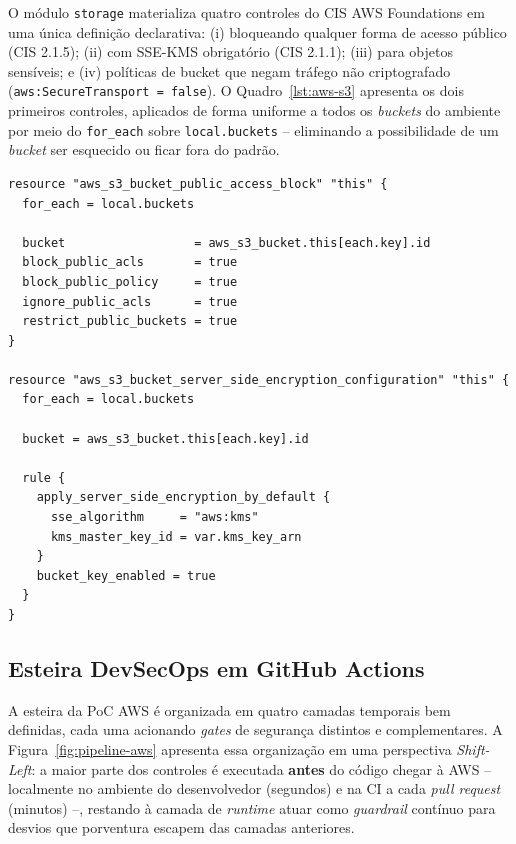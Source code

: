 O módulo \texttt{storage} materializa quatro controles do CIS AWS Foundations em uma única definição declarativa: (i)  bloqueando qualquer forma de acesso público (CIS 2.1.5); (ii)  com SSE-KMS obrigatório (CIS 2.1.1); (iii)  para objetos sensíveis; e (iv) políticas de bucket que negam tráfego não criptografado (\texttt{aws:SecureTransport = false}). O Quadro~\ref{lst:aws-s3} apresenta os dois primeiros controles, aplicados de forma uniforme a todos os \textit{buckets} do ambiente por meio do \texttt{for\_each} sobre \texttt{local.buckets} -- eliminando a possibilidade de um \textit{bucket} ser esquecido ou ficar fora do padrão.

\begin{lstlisting}[language=HCL,caption={Configuração declarativa de segurança para buckets S3 (\texttt{terraform/modules/storage/main.tf}).},label={lst:aws-s3}]
resource "aws_s3_bucket_public_access_block" "this" {
  for_each = local.buckets

  bucket                  = aws_s3_bucket.this[each.key].id
  block_public_acls       = true
  block_public_policy     = true
  ignore_public_acls      = true
  restrict_public_buckets = true
}

resource "aws_s3_bucket_server_side_encryption_configuration" "this" {
  for_each = local.buckets

  bucket = aws_s3_bucket.this[each.key].id

  rule {
    apply_server_side_encryption_by_default {
      sse_algorithm     = "aws:kms"
      kms_master_key_id = var.kms_key_arn
    }
    bucket_key_enabled = true
  }
}
\end{lstlisting}

\subsection{Esteira DevSecOps em GitHub Actions}
\label{sec:pipeline-aws}

A esteira da PoC AWS é organizada em quatro camadas temporais bem definidas, cada uma acionando \textit{gates} de segurança distintos e complementares. A Figura~\ref{fig:pipeline-aws} apresenta essa organização em uma perspectiva \textit{Shift-Left}: a maior parte dos controles é executada \textbf{antes} do código chegar à AWS -- localmente no ambiente do desenvolvedor (segundos) e na CI a cada \textit{pull request} (minutos) --, restando à camada de \textit{runtime} atuar como \textit{guardrail} contínuo para desvios que porventura escapem das camadas anteriores.

